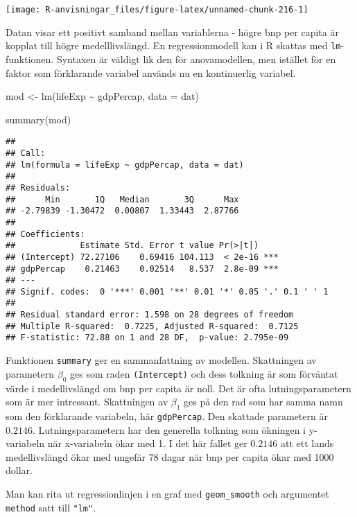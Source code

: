 \documentclass[
]{book}
\newenvironment{Shaded}{\begin{snugshade}}{\end{snugshade}}
\newcommand{\AttributeTok}[1]{\textcolor[rgb]{0.77,0.63,0.00}{#1}}
\newcommand{\FunctionTok}[1]{\textcolor[rgb]{0.00,0.00,0.00}{#1}}
\newcommand{\NormalTok}[1]{#1}
\newcommand{\OtherTok}[1]{\textcolor[rgb]{0.56,0.35,0.01}{#1}}
\newcommand{\SpecialCharTok}[1]{\textcolor[rgb]{0.00,0.00,0.00}{#1}}
\theoremstyle{definition}
\theoremstyle{definition}
\theoremstyle{definition}
\theoremstyle{definition}
\theoremstyle{remark}
\begin{document}
\begin{center}\texttt{[image: R-anvisningar\_files/figure-latex/unnamed-chunk-216-1]} \end{center}

Datan visar ett positivt samband mellan variablerna - högre bnp per capita är kopplat till högre medelllivslängd. En regressionmodell kan i R skattas med \texttt{lm}-funktionen. Syntaxen är väldigt lik den för anovamodellen, men istället för en faktor som förklarande variabel används nu en kontinuerlig variabel.

\begin{Shaded}
\begin{Highlighting}[]
\NormalTok{mod }\OtherTok{\textless{}{-}} \FunctionTok{lm}\NormalTok{(lifeExp }\SpecialCharTok{\textasciitilde{}}\NormalTok{ gdpPercap, }\AttributeTok{data =}\NormalTok{ dat)}

\FunctionTok{summary}\NormalTok{(mod)}
\end{Highlighting}
\end{Shaded}

\begin{verbatim}
## 
## Call:
## lm(formula = lifeExp ~ gdpPercap, data = dat)
## 
## Residuals:
##      Min       1Q   Median       3Q      Max 
## -2.79839 -1.30472  0.00807  1.33443  2.87766 
## 
## Coefficients:
##             Estimate Std. Error t value Pr(>|t|)    
## (Intercept) 72.27106    0.69416 104.113  < 2e-16 ***
## gdpPercap    0.21463    0.02514   8.537  2.8e-09 ***
## ---
## Signif. codes:  0 '***' 0.001 '**' 0.01 '*' 0.05 '.' 0.1 ' ' 1
## 
## Residual standard error: 1.598 on 28 degrees of freedom
## Multiple R-squared:  0.7225, Adjusted R-squared:  0.7125 
## F-statistic: 72.88 on 1 and 28 DF,  p-value: 2.795e-09
\end{verbatim}

Funktionen \texttt{summary} ger en sammanfattning av modellen. Skattningen av parametern \(\beta_0\) ges som raden \texttt{(Intercept)} och dess tolkning är som förväntat värde i medellivslängd om bnp per capita är noll. Det är ofta lutningsparametern som är mer intressant. Skattningen av \(\beta_1\) ges på den rad som har samma namn som den förklarande variabeln, här \texttt{gdpPercap}. Den skattade parametern är \(0.2146\). Lutningsparametern har den generella tolkning som ökningen i y-variabeln när x-variabeln ökar med 1. I det här fallet ger \(0.2146\) att ett lands medellivslängd ökar med ungefär 78 dagar när bnp per capita ökar med 1000 dollar.

Man kan rita ut regressionlinjen i en graf med \texttt{geom\_smooth} och argumentet \texttt{method} satt till \texttt{"lm"}.
\end{document}
